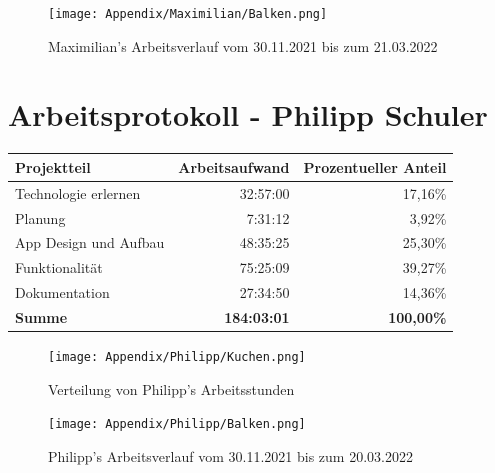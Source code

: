 \begin{figure}[H]
    \begin{center}
        \texttt{[image: Appendix/Maximilian/Balken.png]}
        \caption{Maximilian's Arbeitsverlauf vom 30.11.2021 bis zum 21.03.2022}
    \end{center}
\end{figure}

\section*{Arbeitsprotokoll - Philipp Schuler}

\begin{table}[H]
    \begin{tabular}{lrr}
        \hline
        \textbf{Projektteil}  & \textbf{Arbeitsaufwand} & \textbf{Prozentueller Anteil} \\ \hline
        Technologie erlernen  & 32:57:00                & 17,16\%                       \\
        Planung               & 7:31:12                 & 3,92\%                        \\
        App Design und Aufbau & 48:35:25                & 25,30\%                       \\
        Funktionalität        & 75:25:09                & 39,27\%                       \\
        Dokumentation         & 27:34:50                & 14,36\%                       \\ \hline
        \textbf{Summe}        & \textbf{184:03:01}      & \textbf{100,00\%}             \\ \hline
    \end{tabular}
\end{table}

\begin{figure}[H]
    \begin{center}
        \texttt{[image: Appendix/Philipp/Kuchen.png]}
        \caption{Verteilung von Philipp's Arbeitsstunden}
    \end{center}
\end{figure}

\begin{figure}[H]
    \begin{center}
        \texttt{[image: Appendix/Philipp/Balken.png]}
        \caption{Philipp's Arbeitsverlauf vom 30.11.2021 bis zum 20.03.2022}
    \end{center}
\end{figure}
